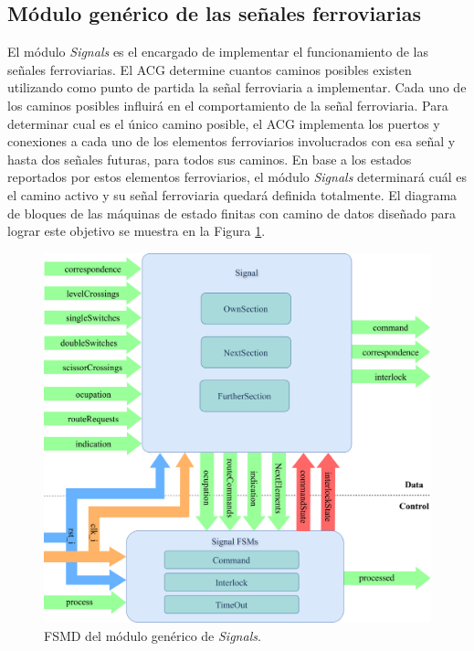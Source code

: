 \subsection{Módulo genérico de las señales ferroviarias}

El módulo \textit{Signals} es el encargado de implementar el funcionamiento de las señales ferroviarias. El ACG determine cuantos caminos posibles existen utilizando como punto de partida la señal ferroviaria a implementar. Cada uno de los caminos posibles influirá en el comportamiento de la señal ferroviaria. Para determinar cual es el único camino posible, el ACG implementa los puertos y conexiones a cada uno de los elementos ferroviarios involucrados con esa señal y hasta dos señales futuras, para todos sus caminos. En base a los estados reportados por estos elementos ferroviarios, el módulo \textit{Signals} determinará cuál es el camino activo y su señal ferroviaria quedará definida totalmente. El diagrama de bloques de las máquinas de estado finitas con camino de datos diseñado para lograr este objetivo se muestra en la Figura \ref{fig:SIG_module}.

\begin{figure}[H]
	\centering
	\includegraphics[width=1\textwidth]{Figuras/SIG_module}
	\centering\caption{FSMD del módulo genérico de \textit{Signals}.}
	\label{fig:SIG_module}
\end{figure}

